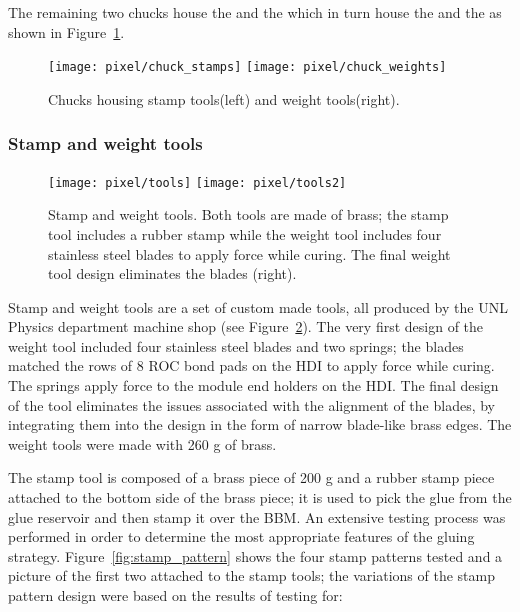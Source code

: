 The remaining two chucks house the  and the  which in turn house the  and the  as shown in Figure~\ref{fig:st_wt_plates}. 

\begin{figure}[!h]
  \centering
  \texttt{[image: pixel/chuck\_stamps]}
  \texttt{[image: pixel/chuck\_weights]}
  \caption[Stamp and Weight tools in chucks]{Chucks housing stamp tools(left) and weight tools(right).}\label{fig:st_wt_plates}
\end{figure}

\subsubsection*{Stamp and weight tools}

\begin{figure}[!h]
  \centering
  \texttt{[image: pixel/tools]}
  \texttt{[image: pixel/tools2]}
  \caption[Stamp and Weight tools]{Stamp and weight tools. Both tools are made of brass; the stamp tool includes a rubber stamp while the weight tool includes four stainless steel blades to apply force while curing. The final weight tool design eliminates the blades (right).}\label{fig:st_wt}
\end{figure}

Stamp and weight tools are a set of custom made tools, all produced by the UNL Physics department machine shop (see Figure~\ref{fig:st_wt}). The very first design of the weight tool included four stainless steel blades and two springs; the blades matched the rows of 8 ROC bond pads on the HDI to apply force while curing. The springs apply force to the module end holders on the HDI. The final design of the tool eliminates the issues associated with the alignment of the blades, by integrating them into the design in the form of narrow blade-like brass edges. The weight tools were made with 260 g of brass.      

The stamp tool is composed of a brass piece of 200 g and a rubber stamp piece attached to the bottom side of the brass piece; it is used to pick the glue from the glue reservoir and then stamp it over the BBM. An extensive testing process was performed in order to determine the most appropriate features of the gluing strategy. Figure~\ref{fig:stamp_pattern} shows the four stamp patterns tested and a picture of the first two attached to the stamp tools; the variations of the stamp pattern design were based on the results of testing for:

